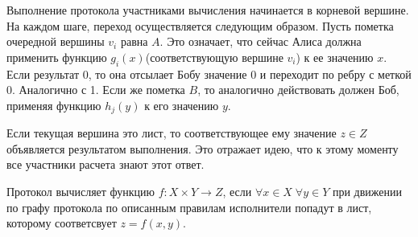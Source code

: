 \documentclass[12pt]{article}
\begin{document}
Выполнение протокола участниками вычисления начинается в корневой вершине.
На каждом шаге, переход осуществляется следующим образом. Пусть пометка очередной вершины $v_i$ равна $A$. Это означает, что сейчас Алиса должна применить функцию $g_i(x)$(соответствующую вершине $v_i$) к ее значению $x$. Если результат 0, то она отсылает Бобу значение 0 и переходит по ребру с меткой 0. Аналогично с 1.
Если же пометка $B$, то аналогично действовать должен Боб, применяя функцию $h_j(y)$ к его значению $y$.

Если текущая вершина это лист, то соответствующее ему значение $z \in Z$ объявляется результатом выполнения.
Это отражает идею, что к этому моменту все участники расчета знают этот ответ.

\begin{Def}
Протокол вычисляет функцию $ f \colon X \times Y \rightarrow Z $, \linebreak
если $ \forall x \in X \; \forall y \in Y $ при движении по графу протокола по описанным правилам исполнители попадут в лист, которому соответсвует $z=f(x,y)$.
\end{Def}
\end{document}
